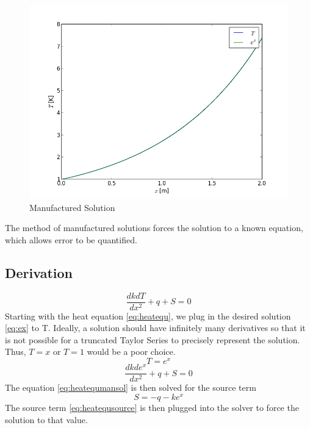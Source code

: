 \documentclass[12pt,twocolumn]{article}
\begin{document}
\begin{figure}
\includegraphics[width=\columnwidth]{plots/output.png}
\caption{Manufactured Solution}
\label{fig:output}
\end{figure}

The method of manufactured solutions forces the solution to a known
equation, which allows error to be quantified.
\subsection*{Derivation}
\begin{equation}\label{eq:heatequ}\frac{dkdT}{dx^2} + q + S = 0\end{equation}
Starting with the heat equation \eqref{eq:heatequ}, we plug in the desired solution \eqref{eq:ex} to T. Ideally, a solution should have infinitely many
derivatives so that it is not possible for a truncated Taylor Series to precisely represent the solution. Thus, $T=x$ or $T=1$ would be a poor
choice.
\begin{equation}\label{eq:ex}T = e^x\end{equation}
\begin{equation}\label{eq:heatequmansol}\frac{dkde^x}{dx^2} + q + S = 0\end{equation}
The equation \eqref{eq:heatequmansol} is then solved for the source term
\begin{equation}\label{eq:heatequsource}S = -q - ke^x\end{equation}
The source term \eqref{eq:heatequsource} is then plugged into the solver to force the solution to that value.
\end{document}
